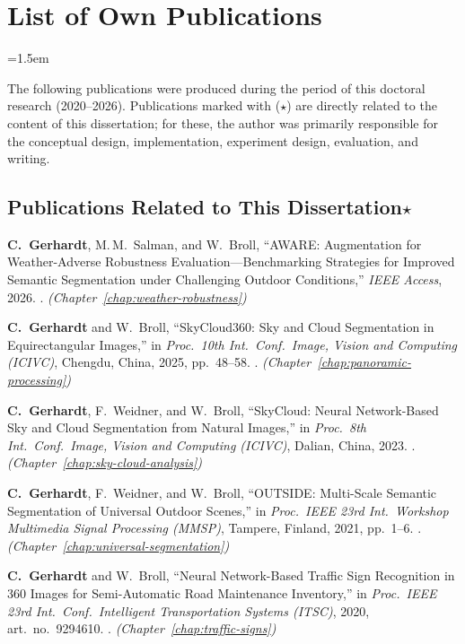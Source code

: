 \chapter*{List of Own Publications}
\emergencystretch=1.5em  %

The following publications were produced during the period of this doctoral research (2020--2026).
Publications marked with ($\star$) are directly related to the content of this dissertation; for these, the author was primarily responsible for the conceptual design, implementation, experiment design, evaluation, and writing.

\section*{Publications Related to This Dissertation\hfill$\star$}

\begin{enumerate}[label={[\arabic*]}, leftmargin=2em]

\item \textbf{C.~Gerhardt}, M.\,M.~Salman, and W.~Broll,
``{AWARE}: Augmentation for Weather-Adverse Robustness Evaluation---Benchmarking Strategies for Improved Semantic Segmentation under Challenging Outdoor Conditions,''
\emph{IEEE Access}, 2026.
.
\hfill\emph{(Chapter~\ref{chap:weather-robustness})}

\item \textbf{C.~Gerhardt} and W.~Broll,
``{SkyCloud360}: Sky and Cloud Segmentation in Equirectangular Images,''
in \emph{Proc.\ 10th Int.\ Conf.\ Image, Vision and Computing (ICIVC)},
Chengdu, China, 2025, pp.~48--58.
.
\hfill\emph{(Chapter~\ref{chap:panoramic-processing})}

\item \textbf{C.~Gerhardt}, F.~Weidner, and W.~Broll,
``{SkyCloud}: Neural Network-Based Sky and Cloud Segmentation from Natural Images,''
in \emph{Proc.\ 8th Int.\ Conf.\ Image, Vision and Computing (ICIVC)},
Dalian, China, 2023.
.
\hfill\emph{(Chapter~\ref{chap:sky-cloud-analysis})}

\item \textbf{C.~Gerhardt}, F.~Weidner, and W.~Broll,
``{OUTSIDE}: Multi-Scale Semantic Segmentation of Universal Outdoor Scenes,''
in \emph{Proc.\ IEEE 23rd Int.\ Workshop Multimedia Signal Processing (MMSP)},
Tampere, Finland, 2021, pp.~1--6.
.
\hfill\emph{(Chapter~\ref{chap:universal-segmentation})}

\item \textbf{C.~Gerhardt} and W.~Broll,
``Neural Network-Based Traffic Sign Recognition in 360{\textdegree} Images for Semi-Automatic Road Maintenance Inventory,''
in \emph{Proc.\ IEEE 23rd Int.\ Conf.\ Intelligent Transportation Systems (ITSC)},
2020, art.~no.~9294610.
.
\hfill\emph{(Chapter~\ref{chap:traffic-signs})}

\end{enumerate}

